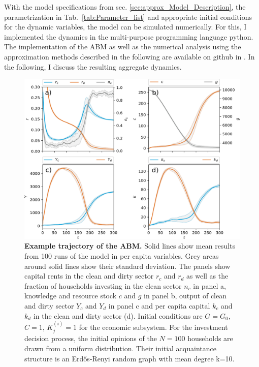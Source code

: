 With the model specifications from sec. \ref{sec:approx_Model_Description}, the parametrization in Tab.~\ref{tab:Parameter_list} and appropriate initial conditions for the dynamic variables, the model can be simulated numerically.
For this, I implemented the dynamics in the multi-purpose programming language python. The implementation of the ABM as well as the numerical analysis using the approximation methods described in the following are available on github in \cite{kolb2018}.
In the following, I discuss the resulting aggregate dynamics.

\begin{figure}[ht]
  \centering\includegraphics[width=.85\linewidth]{figures/example_trajectory.pdf}
  \caption{\textbf{Example trajectory of the ABM.} Solid lines show mean results from 100 runs of the model in per capita variables. Grey areas around solid lines show their standard deviation. The panels show capital rents in the clean and dirty sector $r_c$ and $r_d$ as well as the fraction of households investing in the clean sector $n_c$ in panel a, knowledge and resource stock $c$ and $g$ in panel b, output of clean and dirty sector $Y_c$ and $Y_d$ in panel c and per capita capital $k_c$ and $k_d$ in the clean and dirty sector (d).
Initial conditions are $G=G_0$, $C=1$, $K_j^{(i)}=1$ for the economic subsystem. For the investment decision process, the initial opinions of the $N=100$ households are drawn from a uniform distribution. Their initial acquaintance structure is an Erd\H{o}s-Renyi random graph with mean degree k=10.}
\label{fig:example_trajectory}
\end{figure}

